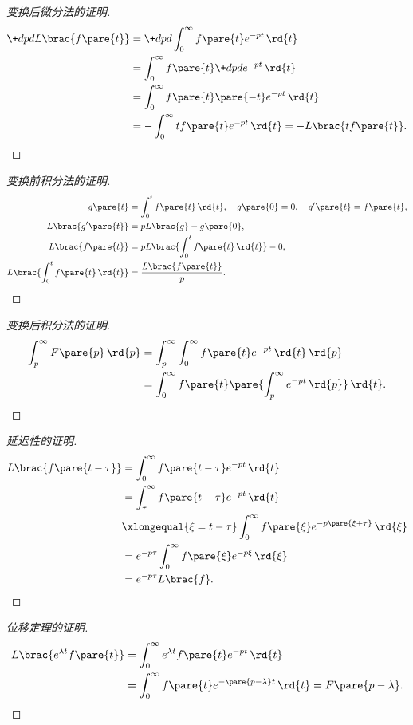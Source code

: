 \documentclass[../ComplexVariable.tex]{subfiles}
\begin{document}
\begin{proof}[变换后微分法的证明]
    \begin{align*}
        \+dpd{}L\brac{f\pare{t}} &= \+dpd{} \int_0^\infty f\pare{t} e^{-pt}\,\rd{t} \\
        &= \int_0^\infty f\pare{t}\+dpd{}e^{-pt}\,\rd{t} \\
        &= \int_0^\infty f\pare{t}\pare{-t}e^{-pt}\,\rd{t} \\
        &= -\int_0^\infty tf\pare{t}e^{-pt}\,\rd{t} = -L\brac{tf\pare{t}}. \qedhere
    \end{align*}
\end{proof}
\begin{proof}[变换前积分法的证明]
    \begin{align*}
        g\pare{t} &= \int_0^t f\pare{t}\,\rd{t},\quad g\pare{0} = 0,\quad g'\pare{t} = f\pare{t}, \\
        L\brac{g'\pare{t}} &= pL\brac{g} - g\pare{0}, \\
        L\brac{f\pare{t}} &= pL\brac{\int_0^t f\pare{t}\,\rd{t}} - 0, \\
        L\brac{\int_0^t f\pare{t}\,\rd{t}} &= \frac{L\brac{f\pare{t}}}{p}. \qedhere
    \end{align*}
\end{proof}
\begin{proof}[变换后积分法的证明]
    \begin{align*}
        \int_p^\infty F\pare{p}\,\rd{p} &= \int_p^\infty \int_0^\infty f\pare{t}e^{-pt}\,\rd{t}\,\rd{p} \\
        &= \int_0^\infty f\pare{t} \pare{\int_p^{\infty} e^{-pt}\,\rd{p}}\,\rd{t}.
    \end{align*}
\end{proof}
\begin{proof}[延迟性的证明]
    \begin{align*}
        L\brac{f\pare{t-\tau}} &= \int_0^\infty f\pare{t-\tau} e^{-pt}\,\rd{t} \\
        &= \int_\tau^\infty f\pare{t-\tau} e^{-pt}\,\rd{t} \\
        &\xlongequal{\xi = t-\tau} \int_0^\infty f\pare{\xi} e^{-p\pare{\xi + \tau}}\,\rd{\xi} \\
        &= e^{-p\tau}\int_0^\infty f\pare{\xi} e^{-p\xi}\,\rd{\xi} \\
        &= e^{-p\tau} L\brac{f}. \qedhere
    \end{align*}
\end{proof}
\begin{proof}[位移定理的证明]
    \begin{align*}
        L\brac{e^{\lambda t}f\pare{t}} &= \int_0^\infty e^{\lambda t}f\pare{t} e^{-pt}\,\rd{t} \\
        &= \int_0^\infty f\pare{t}e^{-\pare{p-\lambda}t}\,\rd{t} = F\pare{p-\lambda}. \qedhere
    \end{align*}
\end{proof}
\end{document}
